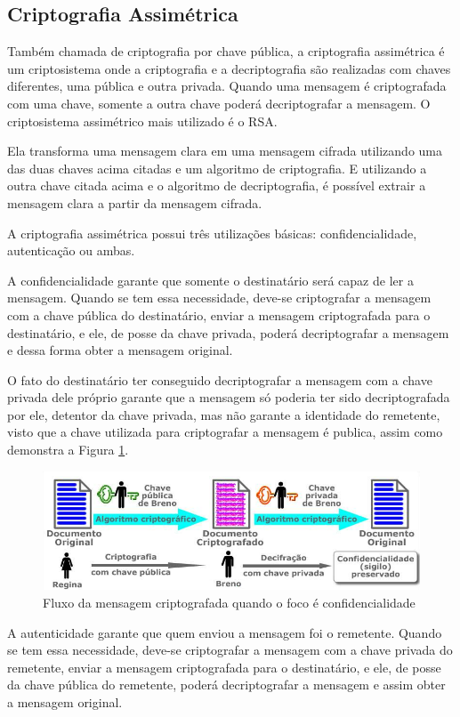 \subsection{Criptografia Assimétrica}
\label{subsec:criptografiaasync}
Também chamada de criptografia por chave pública, a criptografia assimétrica é um criptosistema onde a criptografia e a decriptografia são realizadas com chaves diferentes, uma pública e outra privada. Quando uma mensagem é criptografada com uma chave, somente a outra chave poderá decriptografar  a mensagem. O criptosistema assimétrico mais utilizado é o RSA.

Ela transforma uma mensagem clara em uma mensagem cifrada utilizando uma das duas chaves acima citadas e um algoritmo de criptografia. E utilizando a outra chave citada acima e o algoritmo de decriptografia, é possível extrair a mensagem clara a partir da mensagem cifrada.

A criptografia assimétrica possui três utilizações básicas: confidencialidade, autenticação ou ambas.

A confidencialidade garante que somente o destinatário será capaz de ler a mensagem. Quando se tem essa necessidade, deve-se criptografar a mensagem com a chave pública do destinatário, enviar a mensagem criptografada para o destinatário, e ele, de posse da chave privada, poderá decriptografar a mensagem e dessa forma obter a mensagem original.

O fato do destinatário ter conseguido decriptografar a mensagem com a chave privada dele próprio garante que a mensagem só poderia ter sido decriptografada por ele, detentor da chave privada, mas não garante a identidade do remetente, visto que a chave utilizada para criptografar a mensagem é publica, assim como demonstra a Figura \ref{fig:cripfococonfi}.

\begin{figure}[H]
    \centering
    \caption{Fluxo da mensagem criptografada quando o foco é confidencialidade}
    \label{fig:cripfococonfi}
    \includegraphics[width=.8\linewidth]{Figuras/Confidencialidade.png}
\end{figure}

A autenticidade garante que quem enviou a mensagem foi o remetente. Quando se tem essa necessidade, deve-se criptografar a mensagem com a chave privada do remetente, enviar a mensagem criptografada para o destinatário, e ele, de posse da chave pública do remetente, poderá decriptografar a mensagem e assim obter a mensagem original.

